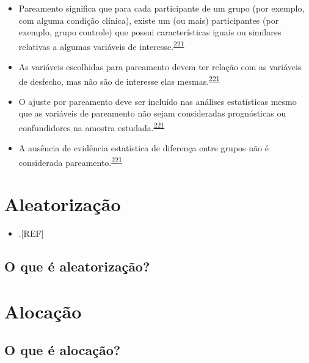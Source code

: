 \documentclass[
  a4paper,
]{book}
\providecommand{\tightlist}{%
  \setlength{\itemsep}{0pt}\setlength{\parskip}{0pt}}
\begin{document}
\begin{itemize}
\item
  Pareamento significa que para cada participante de um grupo (por exemplo, com alguma condição clínica), existe um (ou mais) participantes (por exemplo, grupo controle) que possui características iguais ou similares relativas a algumas variáveis de interesse.\textsuperscript{\protect\hyperlink{ref-Bland1994}{221}}
\item
  As variáveis escolhidas para pareamento devem ter relação com as variáveis de desfecho, mas não são de interesse elas mesmas.\textsuperscript{\protect\hyperlink{ref-Bland1994}{221}}
\item
  O ajuste por pareamento deve ser incluído nas análises estatísticas mesmo que as variáveis de pareamento não sejam consideradas prognósticas ou confundidores na amostra estudada.\textsuperscript{\protect\hyperlink{ref-Bland1994}{221}}
\item
  A ausência de evidência estatística de diferença entre grupos não é considerada pareamento.\textsuperscript{\protect\hyperlink{ref-Bland1994}{221}}
\end{itemize}

\hypertarget{aleatorizauxe7uxe3o}{%
\section{Aleatorização}\label{aleatorizauxe7uxe3o}}

\begin{itemize}
\tightlist
\item
  .{[}REF{]}
\end{itemize}

\hypertarget{o-que-uxe9-aleatorizauxe7uxe3o}{%
\subsection{O que é aleatorização?}\label{o-que-uxe9-aleatorizauxe7uxe3o}}

\hypertarget{alocacao}{%
\section{Alocação}\label{alocacao}}

\hypertarget{o-que-uxe9-alocauxe7uxe3o}{%
\subsection{O que é alocação?}\label{o-que-uxe9-alocauxe7uxe3o}}
\end{document}
